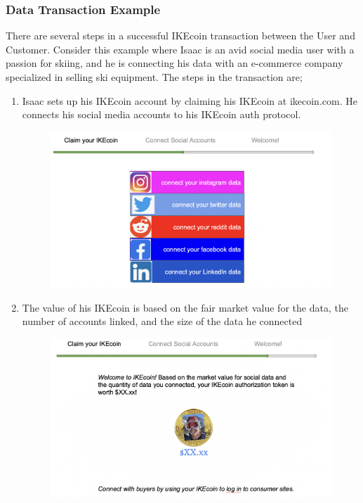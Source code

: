 \documentclass[12pt, letterpaper, twoside]{article}
\begin{document}
\subsubsection*{Data Transaction Example}
There are several steps in a successful IKEcoin transaction between the User and Customer. Consider this example where Isaac is an avid social media user with a passion for skiing, and he is connecting his data with an e-commerce company specialized in selling ski equipment. The steps in the transaction are;
\begin{enumerate}

\item Isaac sets up his IKEcoin account by claiming his IKEcoin at ikecoin.com. He connects his social media accounts to his IKEcoin auth protocol.
\begin{figure}[h]
\includegraphics[scale=0.3]{media/AddSocial.jpg}
\centering
\end{figure}
  
\item The value of his IKEcoin is based on the fair market value for the data, the number of accounts linked, and the size of the data he connected
\begin{figure}[h]
\includegraphics[scale=0.3]{media/Welcome.jpg}
\centering
\end{figure}
   

\end{enumerate}
\end{document}
